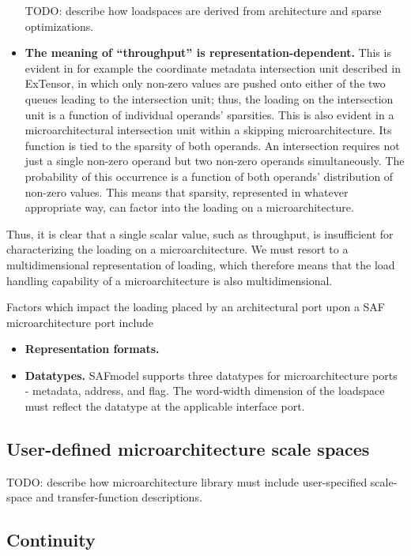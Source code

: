 \begin{itemize}
TODO: describe how loadspaces are derived from architecture and sparse optimizations.

    \item \textbf{The meaning of ``throughput'' is representation-dependent.} This is evident in for example the coordinate metadata intersection unit described in ExTensor\cite{TODO}, in which only non-zero values are pushed onto either of the two queues leading to the intersection unit; thus, the loading on the intersection unit is a function of individual operands' sparsities. This is also evident in a microarchitectural intersection unit within a skipping microarchitecture. Its function is tied to the sparsity of both operands. An intersection requires not just a single non-zero operand but two non-zero operands simultaneously. The probability of this occurrence is a function of both operands' distribution of non-zero values. This means that sparsity, represented in whatever appropriate way, can factor into the loading on a microarchitecture.
\end{itemize}

Thus, it is clear that a single scalar value, such as throughput, is insufficient for characterizing the loading on a microarchitecture. We must resort to a multidimensional representation of loading, which therefore means that the load handling capability of a microarchitecture is also multidimensional.

Factors which impact the loading placed by an architectural port upon a SAF microarchitecture port include

\begin{itemize}
    \item \textbf{Representation formats.}
    \item \textbf{Datatypes.} SAFmodel supports three datatypes for microarchitecture ports - metadata, address, and flag. The word-width dimension of the loadspace must reflect the datatype at the applicable interface port.
\end{itemize}

\subsection{User-defined microarchitecture scale spaces}

TODO: describe how microarchitecture library must include user-specified scale-space and transfer-function descriptions.

\subsection{Continuity}

